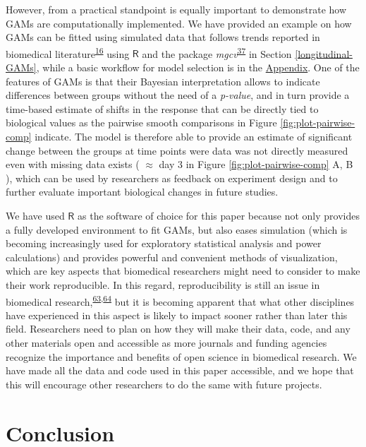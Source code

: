 \documentclass[
]{article}
\begin{document}
However, from a practical standpoint is equally important to demonstrate how GAMs are computationally implemented. We have provided an example on how GAMs can be fitted using simulated data that follows trends reported in biomedical literature\textsuperscript{\protect\hyperlink{ref-vishwanath2009}{16}} using \(\textsf{R}\) and the package \emph{mgcv}\textsuperscript{\protect\hyperlink{ref-wood2017}{37}} in Section \ref{longitudinal-GAMs}, while a basic workflow for model selection is in the \protect\hyperlink{workflow}{Appendix}. One of the features of GAMs is that their Bayesian interpretation allows to indicate differences between groups without the need of a \emph{p-value}, and in turn provide a time-based estimate of shifts in the response that can be directly tied to biological values as the pairwise smooth comparisons in Figure \ref{fig:plot-pairwise-comp} indicate. The model is therefore able to provide an estimate of significant change between the groups at time points were data was not directly measured even with missing data exists ( \(\approx\) day 3 in Figure \ref{fig:plot-pairwise-comp} A, B ), which can be used by researchers as feedback on experiment design and to further evaluate important biological changes in future studies.

We have used \(\textsf{R}\) as the software of choice for this paper because not only provides a fully developed environment to fit GAMs, but also eases simulation (which is becoming increasingly used for exploratory statistical analysis and power calculations) and provides powerful and convenient methods of visualization, which are key aspects that biomedical researchers might need to consider to make their work reproducible. In this regard, reproducibility is still an issue in biomedical research,\textsuperscript{\protect\hyperlink{ref-begley2015}{63},\protect\hyperlink{ref-weissgerber2018}{64}} but it is becoming apparent that what other disciplines have experienced in this aspect is likely to impact sooner rather than later this field. Researchers need to plan on how they will make their data, code, and any other materials open and accessible as more journals and funding agencies recognize the importance and benefits of open science in biomedical research. We have made all the data and code used in this paper accessible, and we hope that this will encourage other researchers to do the same with future projects.

\hypertarget{conclusion}{%
\section{Conclusion}\label{conclusion}}
\end{document}

